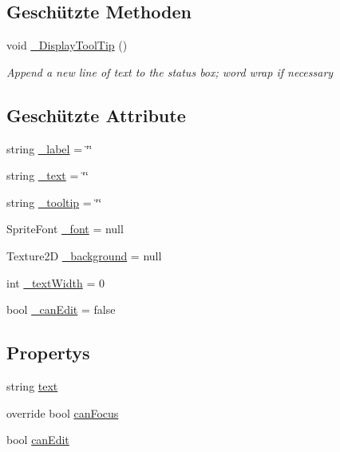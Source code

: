 \subsection*{Geschützte Methoden}
\begin{DoxyCompactItemize}
\item 
void \hyperlink{class_gruppe22_1_1_client_1_1_text_input_a607de727ce5b80faa8134c448ca4da62}{\-\_\-\-Display\-Tool\-Tip} ()
\begin{DoxyCompactList}\small\item\em Append a new line of text to the status box; word wrap if necessary \end{DoxyCompactList}\end{DoxyCompactItemize}
\subsection*{Geschützte Attribute}
\begin{DoxyCompactItemize}
\item 
string \hyperlink{class_gruppe22_1_1_client_1_1_text_input_a725d60af4b5f21d1240f3aefb98a849e}{\-\_\-label} = \char`\"{}\char`\"{}
\item 
string \hyperlink{class_gruppe22_1_1_client_1_1_text_input_a829d2cea87b902b6a62cc3ac904e0592}{\-\_\-text} = \char`\"{}\char`\"{}
\item 
string \hyperlink{class_gruppe22_1_1_client_1_1_text_input_a53174a0caffcd22e7327967ceb3bc9a5}{\-\_\-tooltip} = \char`\"{}\char`\"{}
\item 
Sprite\-Font \hyperlink{class_gruppe22_1_1_client_1_1_text_input_afaa8c705ebedf4acf422f4de1b1f6f71}{\-\_\-font} = null
\item 
Texture2\-D \hyperlink{class_gruppe22_1_1_client_1_1_text_input_aad2ed3307a1e3dd8684a0aba48bfe55d}{\-\_\-background} = null
\item 
int \hyperlink{class_gruppe22_1_1_client_1_1_text_input_a9c383c0270cf48278e25aeb04afc54c2}{\-\_\-text\-Width} = 0
\item 
bool \hyperlink{class_gruppe22_1_1_client_1_1_text_input_a97938831e8ee83ad77e160ea51428505}{\-\_\-can\-Edit} = false
\end{DoxyCompactItemize}
\subsection*{Propertys}
\begin{DoxyCompactItemize}
\item 
string \hyperlink{class_gruppe22_1_1_client_1_1_text_input_a795e9f3cdc6b089dc1cc864907b33f44}{text}
\item 
override bool \hyperlink{class_gruppe22_1_1_client_1_1_text_input_ac50c924f3a99583da29fe82ff09c876e}{can\-Focus}
\item 
bool \hyperlink{class_gruppe22_1_1_client_1_1_text_input_ae512171e8f7caead8c28eb9327ccbf40}{can\-Edit}
\end{DoxyCompactItemize}


